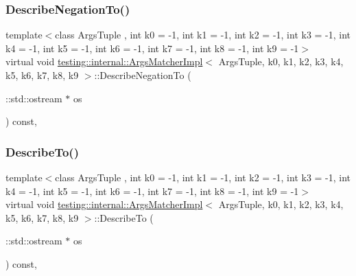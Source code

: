 \subsubsection{\texorpdfstring{DescribeNegationTo()}{DescribeNegationTo()}}
{\footnotesize\ttfamily template$<$class Args\+Tuple , int k0 = -\/1, int k1 = -\/1, int k2 = -\/1, int k3 = -\/1, int k4 = -\/1, int k5 = -\/1, int k6 = -\/1, int k7 = -\/1, int k8 = -\/1, int k9 = -\/1$>$ \\
virtual void \mbox{\hyperlink{classtesting_1_1internal_1_1ArgsMatcherImpl}{testing\+::internal\+::\+Args\+Matcher\+Impl}}$<$ Args\+Tuple, k0, k1, k2, k3, k4, k5, k6, k7, k8, k9 $>$\+::Describe\+Negation\+To (\begin{DoxyParamCaption}\item[{\+::std\+::ostream $\ast$}]{os }\end{DoxyParamCaption}) const\hspace{0.3cm}{\ttfamily [inline]}, {\ttfamily [virtual]}}

\mbox{\label{classtesting_1_1internal_1_1ArgsMatcherImpl_a8e057f67b368f7d94aeb0ddd35837c94}} 
\subsubsection{\texorpdfstring{DescribeTo()}{DescribeTo()}}
{\footnotesize\ttfamily template$<$class Args\+Tuple , int k0 = -\/1, int k1 = -\/1, int k2 = -\/1, int k3 = -\/1, int k4 = -\/1, int k5 = -\/1, int k6 = -\/1, int k7 = -\/1, int k8 = -\/1, int k9 = -\/1$>$ \\
virtual void \mbox{\hyperlink{classtesting_1_1internal_1_1ArgsMatcherImpl}{testing\+::internal\+::\+Args\+Matcher\+Impl}}$<$ Args\+Tuple, k0, k1, k2, k3, k4, k5, k6, k7, k8, k9 $>$\+::Describe\+To (\begin{DoxyParamCaption}\item[{\+::std\+::ostream $\ast$}]{os }\end{DoxyParamCaption}) const\hspace{0.3cm}{\ttfamily [inline]}, {\ttfamily [virtual]}}


